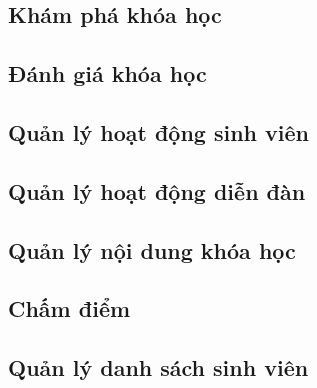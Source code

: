 \documentclass[./../main_file.tex]{subfiles}
\begin{document}
	\subsection{Khám phá khóa học }
	\begin{figure}[H]
	\centering
	\resizebox{1.0\textwidth}{!}{}
	\end{figure}
	
	\subsection{Đánh giá khóa học}
	\begin{figure}[H]
		\centering
		\resizebox{1.0\textwidth}{!}{}
	\end{figure}
	
	\subsection{Quản lý hoạt động sinh viên }
	\begin{figure}[H]
		\centering
		\resizebox{1.0\textwidth}{!}{}
	\end{figure}
	
	\subsection{Quản lý hoạt động diễn đàn}
	\begin{figure}[H]
		\centering
		\resizebox{1.0\textwidth}{!}{}
	\end{figure}
	
	\subsection{Quản lý nội dung khóa học }
	\begin{figure}[H]
		\centering
		\resizebox{1.0\textwidth}{!}{}
	\end{figure}
	
	\subsection{Chấm điểm}
	
	
	\subsection{Quản lý danh sách sinh viên}
	\begin{figure}[H]
		\centering
		\resizebox{1.0\textwidth}{!}{}
	\end{figure}
	
\end{document}
